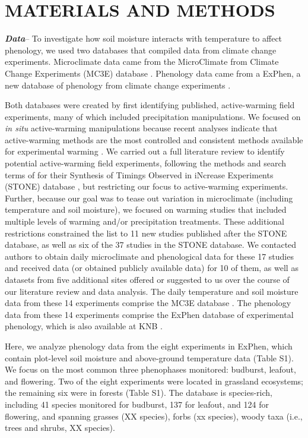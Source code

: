 \documentclass{article}
\begin{document}
\section* {MATERIALS AND METHODS}
\textbf {\emph{Data}}-- To investigate how soil moisture interacts with temperature to affect phenology, we used two databases that compiled data from climate change experiments. Microclimate data came from the MicroClimate from Climate Change Experiments (MC3E) database \citep{ettinger2018, ettinger2019}. Phenology data came from a ExPhen, a new database of phenology from climate change experiments \citep{ettinger2022}. 
\par Both databases were created by first identifying published, active-warming field experiments, many of which included precipitation manipulations. We focused on \textit{in situ} active-warming manipulations because recent analyses indicate that active-warming methods are the most controlled and consistent methods available for experimental warming \citep{kimball2005,kimball2008,aronson2009,wolkovich2012}. We carried out a full literature review to identify potential active-warming field experiments, following the methods and search terms of \citet{wolkovich2012} for their Synthesis of Timings Observed in iNcrease Experiments (STONE) database \citep{wolkovich2012}, but restricting our focus to active-warming experiments. Further, because our goal was to tease out variation in microclimate (including temperature and soil moisture), we focused on warming studies that included multiple levels of warming and/or precipitation treatments. These additional restrictions constrained the list to 11 new studies published after the STONE database, as well as six of the 37 studies in the STONE database. We contacted authors to obtain daily microclimate and phenological data for these 17 studies and received data (or obtained publicly available data) for 10 of them, as well as datasets from five additional sites offered or suggested to us over the course of our literature review and data analysis. The daily temperature and soil moisture data from these 14 experiments comprise the MC3E database \citep{ettinger2018,ettinger2019}. The phenology data from these 14 experiments comprise the ExPhen database of experimental phenology, which is also available at KNB \citep{ettinger2022}. 
\par Here, we analyze phenology data from the eight experiments in ExPhen, which contain plot-level soil moisture and above-ground temperature data (Table S1). We focus on the most common three phenophases monitored: budburst, leafout, and flowering. Two of the eight experiments were located in grassland ecosystems; the remaining six were in forests (Table S1). The database is species-rich, including 41 species monitored for budburst, 137 for leafout, and 124 for flowering, and spanning grasses (XX species), forbs (xx species), woody taxa (i.e., trees and shrubs, XX species). %
\end{document}
